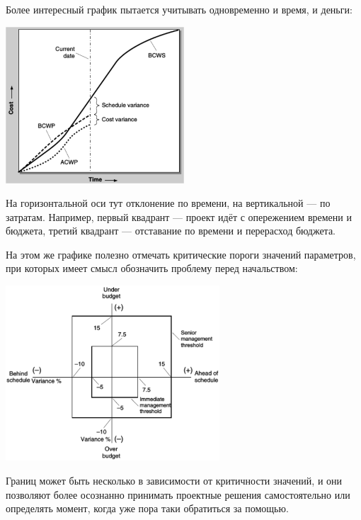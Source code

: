 \documentclass{../../text-style}
\begin{document}
Более интересный график пытается учитывать одновременно и время, и деньги:

\begin{center}
    \includegraphics[width=0.5\textwidth]{metricsGraph.png}
\end{center}

На горизонтальной оси тут отклонение по времени, на вертикальной --- по затратам. Например, первый квадрант --- проект идёт с опережением времени и бюджета, третий квадрант --- отставание по времени и перерасход бюджета.

На этом же графике полезно отмечать критические пороги значений параметров, при которых имеет смысл обозначить проблему перед начальством:

\begin{center}
    \includegraphics[width=0.6\textwidth]{escalationThresholds.png}
\end{center}

Границ может быть несколько в зависимости от критичности значений, и они позволяют более осознанно принимать проектные решения самостоятельно или определять момент, когда уже пора таки обратиться за помощью. 
\end{document}

